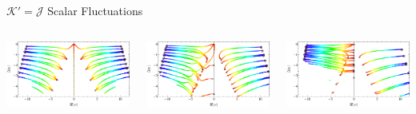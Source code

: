 \documentclass[aspectratio=169, xcolor=dvipsnames]{beamer}
\begin{document}
\begin{frame}{\(\mathcal K' = \mathcal J\) Scalar Fluctuations}

  \begin{columns}[T]
    \begin{column}{0.33\textwidth}
      \includegraphics[width=1.05\textwidth]{figs/scalar_ef_spherical_a0.pdf}
    \end{column}

    \begin{column}{0.33\textwidth}
      \includegraphics[width=1.05\textwidth]{figs/scalar_ef_spherical_a1_2.pdf}
    \end{column}

    \begin{column}{0.33\textwidth}
      \includegraphics[width=1.05\textwidth]{figs/scalar_ef_spherical_a9_10.pdf}
    \end{column}
  \end{columns}


\end{frame}
\end{document}
